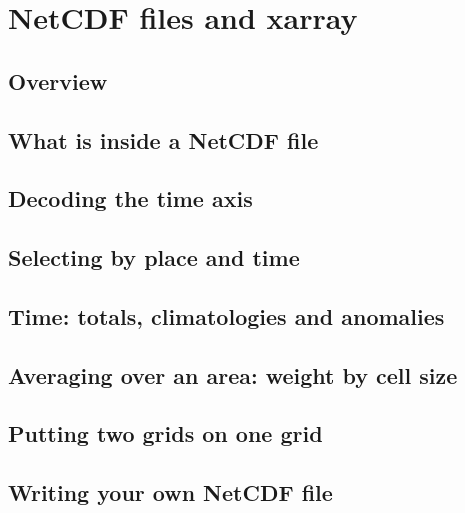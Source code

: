 \chapter{NetCDF files and xarray}\label{ch:netcdf}

\section{Overview}


\section{What is inside a NetCDF file}


\section{Decoding the time axis}


\section{Selecting by place and time}


\section{Time: totals, climatologies and anomalies}


\section{Averaging over an area: weight by cell size}


\section{Putting two grids on one grid}


\section{Writing your own NetCDF file}

